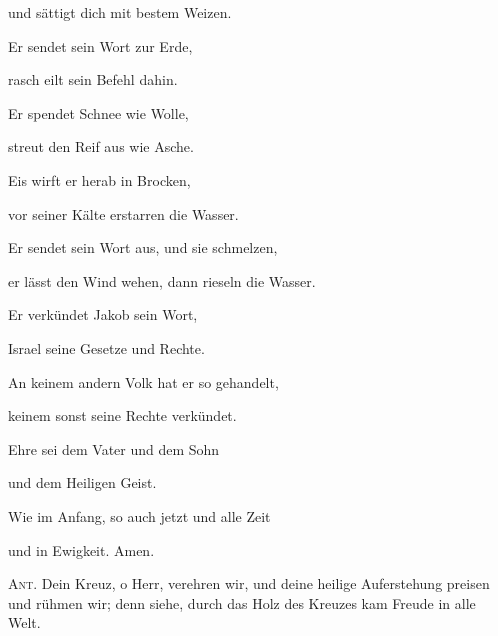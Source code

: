 und sättigt dich mit bestem Weizen.

\noindent Er sendet sein Wort zur Erde,~\GreStar{}~\nopagebreak

rasch eilt sein Befehl dahin.

\noindent Er spendet Schnee wie Wolle,~\GreStar{}~\nopagebreak

streut den Reif aus wie Asche.

\noindent Eis wirft er herab in Brocken,~\GreStar{}~\nopagebreak

vor seiner Kälte erstarren die Wasser.

\noindent Er sendet sein Wort aus, und sie schmelzen,~\GreStar{}~\nopagebreak

er lässt den Wind wehen, dann rieseln die Wasser.

\noindent Er verkündet Jakob sein Wort,~\GreStar{}~\nopagebreak

Israel seine Gesetze und Rechte.

\noindent An keinem andern Volk hat er so gehandelt,~\GreStar{}~\nopagebreak

keinem sonst seine Rechte verkündet.

\noindent Ehre sei dem Vater und dem Sohn~\GreStar{}~\nopagebreak

und dem Heiligen Geist.

\noindent Wie im Anfang, so auch jetzt und alle Zeit~\GreStar{}~\nopagebreak

und in Ewigkeit. Amen.

\vspace{10pt}

\noindent \textsc{Ant.} Dein Kreuz, o Herr, verehren wir, und deine heilige Auferstehung preisen und rühmen wir; denn siehe, durch das Holz des Kreuzes kam Freude in alle Welt.

